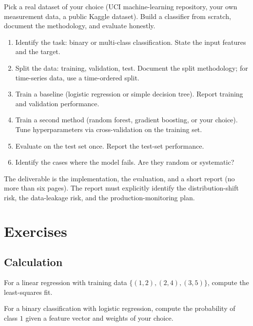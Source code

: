 \begin{project}
Pick a real dataset of your choice (UCI machine-learning repository, your own measurement data, a public Kaggle dataset). Build a classifier from scratch, document the methodology, and evaluate honestly.

\begin{enumerate}[leftmargin=*]
  \item Identify the task: binary or multi-class classification. State the input features and the target.
  \item Split the data: training, validation, test. Document the split methodology; for time-series data, use a time-ordered split.
  \item Train a baseline (logistic regression or simple decision tree). Report training and validation performance.
  \item Train a second method (random forest, gradient boosting, or your choice). Tune hyperparameters via cross-validation on the training set.
  \item Evaluate on the test set once. Report the test-set performance.
  \item Identify the cases where the model fails. Are they random or systematic?
\end{enumerate}

The deliverable is the implementation, the evaluation, and a short report (no more than six pages). The report must explicitly identify the distribution-shift risk, the data-leakage risk, and the production-monitoring plan.
\end{project}

\section{Exercises}

\subsection*{Calculation}

\begin{exercise}
For a linear regression with training data $\{(1, 2), (2, 4), (3, 5)\}$, compute the least-squares fit.
\end{exercise}

\begin{exercise}
For a binary classification with logistic regression, compute the probability of class $1$ given a feature vector and weights of your choice.
\end{exercise}

